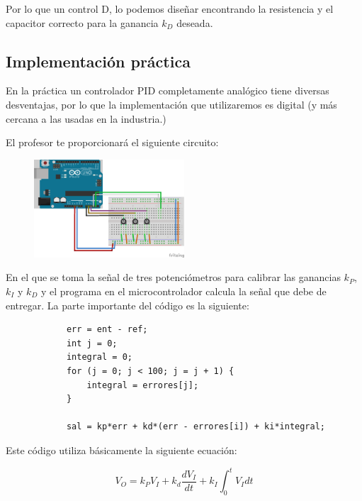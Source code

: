 			Por lo que un control D, lo podemos diseñar encontrando la resistencia y el capacitor correcto para la ganancia $k_D$ deseada.


	\subsection{Implementación práctica}

		En la práctica un controlador PID completamente analógico tiene diversas desventajas, por lo que la implementación que utilizaremos es digital (y más cercana a las usadas en la industria.)

		El profesor te proporcionará el siguiente circuito:

		\begin{figure}[h]
			\begin{center}
				\includegraphics[width=0.5\textwidth]{images/ControlPID.png}
			\end{center}
		\end{figure}

		En el que se toma la señal de tres potenciómetros para calibrar las ganancias $k_P$, $k_I$ y $k_D$ y el programa en el microcontrolador calcula la señal que debe de entregar. La parte importante del código es la siguiente:

		\begin{verbatim}
			err = ent - ref;
			int j = 0;
			integral = 0;
			for (j = 0; j < 100; j = j + 1) {
				integral = errores[j];
			}

			sal = kp*err + kd*(err - errores[i]) + ki*integral;
		\end{verbatim}

		Este código utiliza básicamente la siguiente ecuación:

		\begin{equation}
			V_O = k_P V_I + k_d \frac{d V_I}{dt} + k_I \int_0^t V_I dt
		\end{equation}


